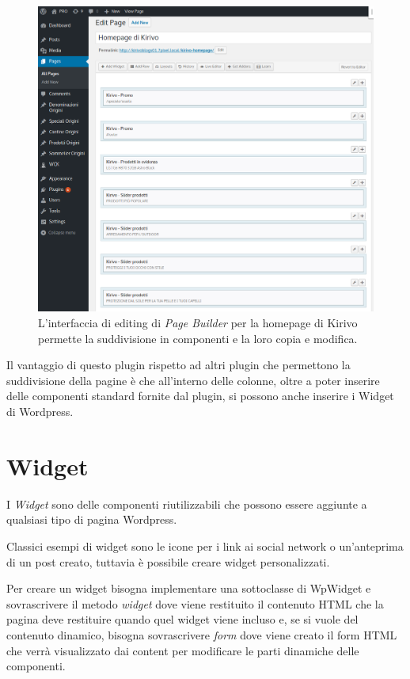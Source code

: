 \begin{figure}
  \includegraphics[width=\textwidth]{figure/pagebuilder.png}
  \caption{L'interfaccia di editing di \emph{Page Builder} per la homepage di Kirivo permette
  la suddivisione in componenti e la loro copia e modifica.}
  \label{fig:wsource}
\end{figure}


Il vantaggio di questo plugin rispetto ad altri plugin che permettono la suddivisione della pagine è che all'interno delle colonne,
oltre a poter inserire delle componenti standard fornite dal plugin, si possono anche inserire i Widget di Wordpress.

\section{Widget}
I \emph{Widget} sono delle componenti riutilizzabili che possono essere aggiunte a qualsiasi
tipo di pagina Wordpress. 

Classici esempi di widget sono le icone per i link ai social network o un'anteprima di un post creato, tuttavia è possibile creare widget
personalizzati.

Per creare un widget bisogna implementare una sottoclasse di WpWidget\cite{WPWID}
e sovrascrivere il metodo \emph{widget} dove viene restituito il contenuto HTML che la pagina deve restituire quando quel widget viene incluso
e, se si vuole del contenuto dinamico, bisogna sovrascrivere \emph{form} dove viene creato il form HTML che verrà visualizzato dai content per modificare le
parti dinamiche delle componenti.

